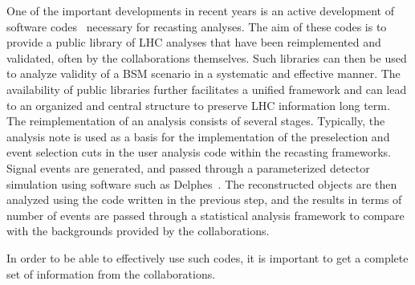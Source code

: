 One of the important developments in recent years is an active development of software codes~\cite{Dumont:2014tja, Conte:2014zja, Kim:2015wza,Cranmer:2010hk,ATOM} necessary for recasting analyses. The aim of these codes is to provide a public library of LHC analyses that have been reimplemented and validated, often by the collaborations themselves. Such libraries can then be used to analyze validity of a BSM scenario in a systematic and effective manner. The availability of public libraries further facilitates a unified framework and can lead to an organized and central structure to preserve LHC information long term.
The reimplementation of an analysis consists of several stages. Typically, the analysis note is used as a basis for the implementation of the preselection and event selection cuts in the user analysis code within the recasting frameworks. Signal events are generated, and passed through a parameterized detector simulation using software such as Delphes~\cite{deFavereau:2013fsa}. The reconstructed objects are then analyzed using the code written in the previous step, and the results in terms of number of events are passed through a statistical analysis framework to compare with the backgrounds provided by the collaborations. 

In order to be able to effectively use such codes, it is important to get a complete set of information from the collaborations. 

